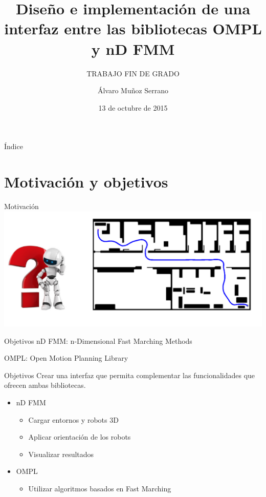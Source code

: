 \documentclass[10pt]{beamer}
\title{Diseño e implementación de una interfaz entre las bibliotecas OMPL y nD FMM \vspace{0.5cm}}
\subtitle{TRABAJO FIN DE GRADO}  %
\date{13 de octubre de 2015}
\author{
Álvaro Muñoz Serrano
}
\institute[
] %
{%
 Departamento de Sistemas y Automática
  
}
\begin{document}
{%
\begin{frame} %
  \titlepage
\end{frame}}

\begin{frame}{Índice}{}
\tableofcontents
\end{frame}

\section{Motivación y objetivos}

\begin{frame}{Motivación}		\includegraphics[width=\textwidth,height=0.8\textheight,keepaspectratio]{dudabot}
\end{frame}

\begin{frame}{Objetivos}
	\large nD FMM: n-Dimensional Fast Marching Methods
	\vspace{1cm}
	
	\large OMPL: Open Motion Planning Library
\end{frame}

\begin{frame}{Objetivos}
Crear una interfaz que permita complementar las funcionalidades que ofrecen ambas bibliotecas.
\vspace{0.3cm}
\begin{itemize}
	\item nD FMM
		\begin{itemize}
			\item Cargar entornos y robots 3D
			\item Aplicar orientación de los robots
			\item Visualizar resultados
		\end{itemize}
		\vspace{0.3cm}
	\item OMPL
		\begin{itemize}
			\item Utilizar algoritmos basados en Fast Marching
		\end{itemize}
\end{itemize}
\end{frame}
\end{document}
